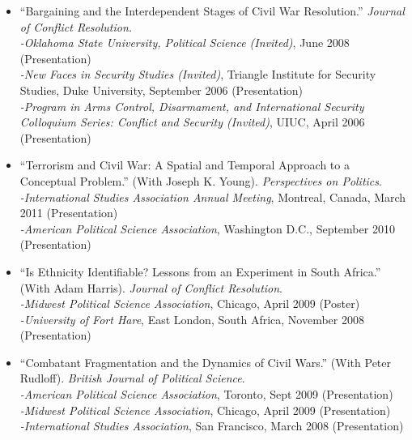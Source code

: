 \documentclass[10pt]{article}
\begin{document}
\begin{itemize}
\item ``Bargaining and the Interdependent Stages of Civil War Resolution.'' \textit{Journal of Conflict Resolution.}
	\\ \indent \textit{-Oklahoma State University, Political Science (Invited)}, June 2008 (Presentation)
	\\ \indent  \textit{-New Faces in Security Studies (Invited)}, Triangle Institute for Security Studies, Duke University, September 2006 (Presentation)
	\\ \indent \textit{-Program in Arms Control, Disarmament, and International Security Colloquium Series: Conflict and Security (Invited)}, UIUC, April 2006 (Presentation)

\item ``Terrorism and Civil War: A Spatial and Temporal Approach to a Conceptual Problem.'' (With Joseph K. Young). \textit{Perspectives on Politics}. 
	   \\ \indent \textit{-International Studies Association Annual Meeting}, Montreal, Canada, March 2011 (Presentation)
	   \\ \indent \textit{-American Political Science Association}, Washington D.C., September 2010 (Presentation)


\item ``Is Ethnicity Identifiable? Lessons from an Experiment in South Africa.'' (With Adam Harris). \textit{Journal of Conflict Resolution}.
    	\\ \indent \textit{-Midwest Political Science Association}, Chicago, April 2009 (Poster)
    	\\ \indent \textit{-University of Fort Hare}, East London, South Africa, November 2008 (Presentation)

\item ``Combatant Fragmentation and the Dynamics of Civil Wars.'' (With Peter Rudloff). \textit{British Journal of Political Science}. 
    	\\ \indent \textit{-American Political Science Association}, Toronto, Sept 2009 (Presentation)
    	\\ \indent \textit{-Midwest Political Science Association}, Chicago, April 2009 (Presentation)
    	\\ \indent \textit{-International Studies Association}, San Francisco, March 2008 (Presentation)


\end{itemize}
\end{document}
